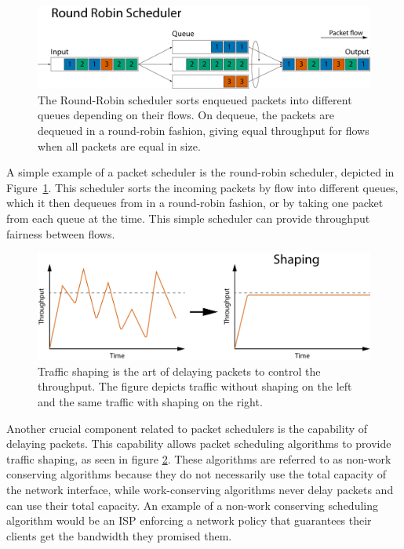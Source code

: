 \documentclass[sigconf, nonacm]{acmart}
\begin{document}
\begin{figure}
  \includegraphics[width=\linewidth]{round-robin.pdf}
  \caption{The Round-Robin scheduler sorts enqueued packets into different queues depending on their flows. On dequeue, the packets are dequeued in a round-robin fashion, giving equal throughput for flows when all packets are equal in size.}
  \label{fig:round_robin}
\end{figure}

A simple example of a packet scheduler is the round-robin scheduler\cite{nagle1987packet}, depicted in Figure~\ref{fig:round_robin}. This scheduler sorts the incoming packets by flow into different queues, which it then dequeues from in a round-robin fashion, or by taking one packet from each queue at the time. This simple scheduler can provide throughput fairness between flows.


\begin{figure}
  \includegraphics[width=\linewidth]{traffic-shaping.pdf}
  \caption{Traffic shaping is the art of delaying packets to control the throughput. The figure depicts traffic without shaping on the left and the same traffic with shaping on the right.}
  \label{fig:traffic_shaping}
\end{figure}

Another crucial component related to packet schedulers is the capability of delaying packets. This capability allows packet scheduling algorithms to provide traffic shaping, as seen in figure \ref{fig:traffic_shaping}. These algorithms are referred to as non-work conserving algorithms because they do not necessarily use the total capacity of the network interface, while work-conserving algorithms never delay packets and can use their total capacity. An example of a non-work conserving scheduling algorithm would be an ISP enforcing a network policy that guarantees their clients get the bandwidth they promised them.
\end{document}
